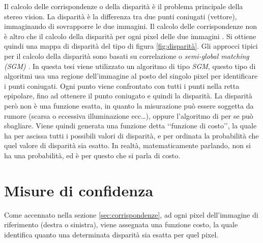 \documentclass[12pt]{report}
\newcommand{\nullpage}{\newpage\null\thispagestyle{empty}}  %
\begin{document}
			Il calcolo delle corrispondenze o della disparità è il problema principale della stereo vision. \newline
			La disparità è la differenza tra due punti coniugati (vettore), immaginando di sovrapporre le due immagini. Il calcolo delle corrispondenze non è altro che il calcolo della disparità per ogni pixel delle due immagini \cite{fusiello}. Si ottiene quindi una mappa di disparità del tipo di figura \ref{fig:disparità}.\newline
			Gli approcci tipici per il calcolo della disparità sono basati su correlazione \cite{correlation} o \textit{semi-global matching (SGM)} \cite{SGM}. In questa tesi viene utilizzato un algoritmo di tipo \textit{SGM}, questo tipo di algoritmi usa una regione dell'immagine al posto del singolo pixel per identificare i punti coniugati. Ogni punto viene confrontato con tutti i punti nella retta epipolare, fino ad ottenere il punto coniugato e quindi la disparità. La disparità però non è una funzione esatta, in quanto la misurazione può essere soggetta da rumore (scarsa o eccessiva illuminazione ecc\dots), oppure l'algoritmo di per se può sbagliare. Viene quindi generata una funzione detta ‘‘funzione di costo’’, la quale ha per ascissa tutti i possibili valori di disparità, e per ordinata la probabilità che quel valore di disparità sia esatto. In realtà, matematicamente parlando, non si ha una probabilità, ed è per questo che si parla di costo. 
			

			



	\nullpage
	
	\chapter{Misure di confidenza}
	\label{sec:confidenza}
	\pagestyle{fancy}
	
		Come accennato nella sezione \ref{sec:corrispondenze}, ad ogni pixel dell'immagine di riferimento (destra o sinistra), viene assegnata una funzione costo, la quale identifica quanto una determinata disparità sia esatta per quel pixel.
			
\end{document}
